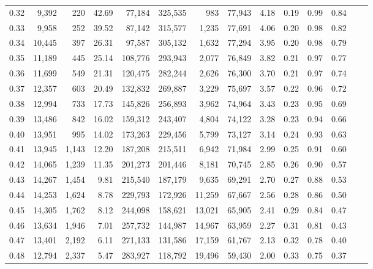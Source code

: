 \begin{tabular}{rrrrrrrrrrrrrr}
0.32 &   9,392 &    220 &    42.69 &   77,184 &  325,535 &     983 &  77,943 &  4.18 &  0.19 &  0.99 &      0.84 \\
0.33 &   9,958 &    252 &    39.52 &   87,142 &  315,577 &   1,235 &  77,691 &  4.06 &  0.20 &  0.98 &      0.82 \\
0.34 &  10,445 &    397 &    26.31 &   97,587 &  305,132 &   1,632 &  77,294 &  3.95 &  0.20 &  0.98 &      0.79 \\
0.35 &  11,189 &    445 &    25.14 &  108,776 &  293,943 &   2,077 &  76,849 &  3.82 &  0.21 &  0.97 &      0.77 \\
0.36 &  11,699 &    549 &    21.31 &  120,475 &  282,244 &   2,626 &  76,300 &  3.70 &  0.21 &  0.97 &      0.74 \\
0.37 &  12,357 &    603 &    20.49 &  132,832 &  269,887 &   3,229 &  75,697 &  3.57 &  0.22 &  0.96 &      0.72 \\
0.38 &  12,994 &    733 &    17.73 &  145,826 &  256,893 &   3,962 &  74,964 &  3.43 &  0.23 &  0.95 &      0.69 \\
0.39 &  13,486 &    842 &    16.02 &  159,312 &  243,407 &   4,804 &  74,122 &  3.28 &  0.23 &  0.94 &      0.66 \\
0.40 &  13,951 &    995 &    14.02 &  173,263 &  229,456 &   5,799 &  73,127 &  3.14 &  0.24 &  0.93 &      0.63 \\
0.41 &  13,945 &  1,143 &    12.20 &  187,208 &  215,511 &   6,942 &  71,984 &  2.99 &  0.25 &  0.91 &      0.60 \\
0.42 &  14,065 &  1,239 &    11.35 &  201,273 &  201,446 &   8,181 &  70,745 &  2.85 &  0.26 &  0.90 &      0.57 \\
0.43 &  14,267 &  1,454 &     9.81 &  215,540 &  187,179 &   9,635 &  69,291 &  2.70 &  0.27 &  0.88 &      0.53 \\
0.44 &  14,253 &  1,624 &     8.78 &  229,793 &  172,926 &  11,259 &  67,667 &  2.56 &  0.28 &  0.86 &      0.50 \\
0.45 &  14,305 &  1,762 &     8.12 &  244,098 &  158,621 &  13,021 &  65,905 &  2.41 &  0.29 &  0.84 &      0.47 \\
0.46 &  13,634 &  1,946 &     7.01 &  257,732 &  144,987 &  14,967 &  63,959 &  2.27 &  0.31 &  0.81 &      0.43 \\
0.47 &  13,401 &  2,192 &     6.11 &  271,133 &  131,586 &  17,159 &  61,767 &  2.13 &  0.32 &  0.78 &      0.40 \\
0.48 &  12,794 &  2,337 &     5.47 &  283,927 &  118,792 &  19,496 &  59,430 &  2.00 &  0.33 &  0.75 &      0.37 \\

\end{tabular}
